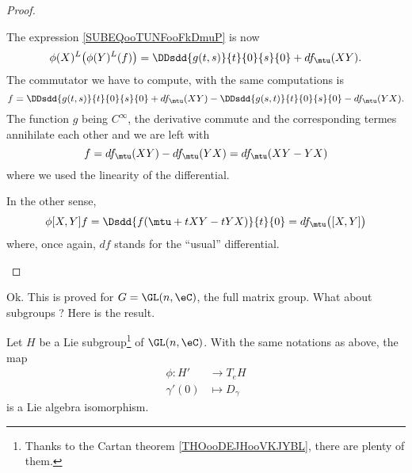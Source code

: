 \begin{proof}
\begin{subproof}
            The expression \eqref{SUBEQooTUNFooFkDmuP} is now
            \begin{equation}
                \phi(X)^L\big( \phi(Y)^L(f) \big)=\DDsdd{ g(t,s) }{t}{0}{s}{0}+df_{\mtu}(XY).
            \end{equation}
            The commutator we have to compute, with the same computations is
            \begin{equation}
                [\phi(X),\phi(Y)]f=\DDsdd{ g(t,s) }{t}{0}{s}{0}+df_{\mtu}(XY)-\DDsdd{ g(s,t) }{t}{0}{s}{0}-df_{\mtu}(YX).
            \end{equation}
            The function \( g\) being \(  C^{\infty}\), the derivative commute and the corresponding termes annihilate each other and we are left with
            \begin{equation}
                [\phi(X),\phi(Y)]f=df_{\mtu}(XY)-df_{\mtu}(YX)=df_{\mtu}(XY-YX)
            \end{equation}
            where we used the linearity of the differential.

            In the other sense,
            \begin{equation}
                \phi[X,Y]f=\Dsdd{ f(\mtu+tXY-tYX) }{t}{0}=df_{\mtu}\big( [X,Y] \big)
            \end{equation}
            where, once again, \( df\) stands for the ``usual'' differential.
    \end{subproof}
\end{proof}

Ok. This is proved for \( G=\GL(n,\eC)\), the full matrix group. What about subgroups ? Here is the result.

\begin{proposition}      \label{PROPooSQHLooGQAykc}
    Let \( H\) be a Lie subgroup\footnote{Thanks to the Cartan theorem \ref{THOooDEJHooVKJYBL}, there are plenty of them.} of \( \GL(n,\eC)\). With the same notations as above, the map
    \begin{equation}
        \begin{aligned}
            \phi\colon H'&\to T_eH \\
            \gamma'(0)&\mapsto D_{\gamma} 
        \end{aligned}
    \end{equation}
    is a Lie algebra isomorphism.
\end{proposition}

